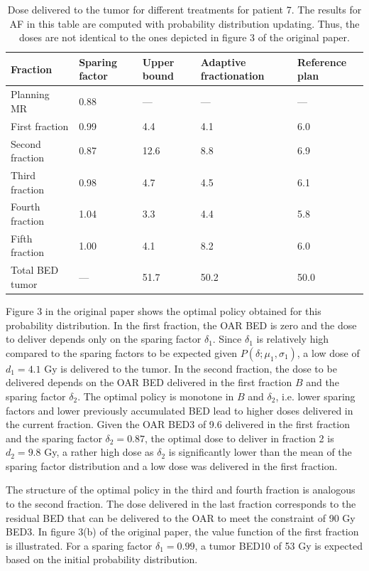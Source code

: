 \documentclass[11pt]{article}
\newcommand{\toprule}{\hline}
\newcommand{\midrule}{\hline}
\newcommand{\bottomrule}{\hline}
\begin{document}
\begin{table}[ht]
\centering
\caption{Dose delivered to the tumor for different treatments for patient 7. The results for AF in this table are computed with probability distribution updating. Thus, the doses are not identical to the ones depicted in figure 3 of the original paper.}
\label{tab:patient7}
\begin{tabular}{lllll}
\toprule
Fraction & Sparing factor & Upper bound & Adaptive fractionation & Reference plan \\
\midrule
Planning MR & 0.88 & --- & --- & --- \\
First fraction & 0.99 & 4.4 & 4.1 & 6.0 \\
Second fraction & 0.87 & 12.6 & 8.8 & 6.9 \\
Third fraction & 0.98 & 4.7 & 4.5 & 6.1 \\
Fourth fraction & 1.04 & 3.3 & 4.4 & 5.8 \\
Fifth fraction & 1.00 & 4.1 & 8.2 & 6.0 \\
Total BED tumor & --- & 51.7 & 50.2 & 50.0 \\
\bottomrule
\end{tabular}
\end{table}

Figure 3 in the original paper shows the optimal policy obtained for this probability distribution. In the first fraction, the OAR BED is zero and the dose to deliver depends only on the sparing factor $\delta_1$. Since $\delta_1$ is relatively high compared to the sparing factors to be expected given $P(\delta; \mu_1, \sigma_1)$, a low dose of $d_1 = 4.1$ Gy is delivered to the tumor. In the second fraction, the dose to be delivered depends on the OAR BED delivered in the first fraction $B$ and the sparing factor $\delta_2$. The optimal policy is monotone in $B$ and $\delta_2$, i.e. lower sparing factors and lower previously accumulated BED lead to higher doses delivered in the current fraction. Given the OAR BED3 of 9.6 delivered in the first fraction and the sparing factor $\delta_2 = 0.87$, the optimal dose to deliver in fraction 2 is $d_2 = 9.8$ Gy, a rather high dose as $\delta_2$ is significantly lower than the mean of the sparing factor distribution and a low dose was delivered in the first fraction.

The structure of the optimal policy in the third and fourth fraction is analogous to the second fraction. The dose delivered in the last fraction corresponds to the residual BED that can be delivered to the OAR to meet the constraint of 90 Gy BED3. In figure 3(b) of the original paper, the value function of the first fraction is illustrated. For a sparing factor $\delta_1 = 0.99$, a tumor BED10 of 53 Gy is expected based on the initial probability distribution.
\end{document}
